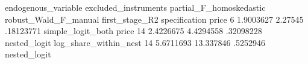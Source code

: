 endogenous_variable	excluded_instruments	partial_F_homoskedastic	robust_Wald_F_manual	first_stage_R2	specification
price	6	1.9003627	2.27545	.18123771	simple_logit_both
price	14	2.4226675	4.4294558	.32098228	nested_logit
log_share_within_nest	14	5.6711693	13.337846	.5252946	nested_logit
